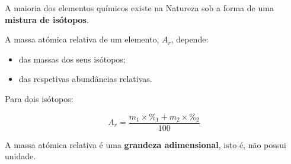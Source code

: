 \documentclass[11pt,a4paper]{article}
\begin{document}
	\begin{recorda}
		
		A maioria dos elementos químicos existe na Natureza sob a forma de uma
		\textbf{mistura de isótopos}.
		
		A massa atómica relativa de um elemento, \(A_r\), depende:
		
		\begin{itemize}
			\item das massas dos seus isótopos;
			\item das respetivas abundâncias relativas.
		\end{itemize}
		
		Para dois isótopos:
		
		\[
		\boxed{
			A_r=
			\frac{
				m_1\times \%_1+
				m_2\times \%_2
			}{100}
		}
		\]
		
		A massa atómica relativa é uma \textbf{grandeza adimensional}, isto é,
		não possui unidade.
		
	\end{recorda}
	
	
\end{document}
